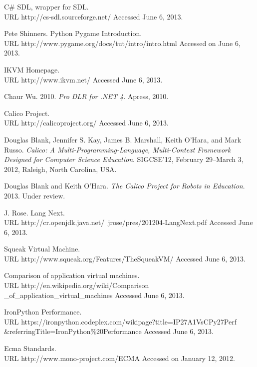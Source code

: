 \documentclass[preprint]{sigplanconf}
\begin{document}
\begin{thebibliography}{}
C\# SDL, wrapper for SDL.\\ URL http://cs-sdl.sourceforge.net/ Accessed June 6, 2013.

Pete Shinners. Python Pygame Introduction.\\ URL http://www.pygame.org/docs/tut/intro/intro.html Accessed on June 6, 2013.

IKVM Homepage.\\ URL http://www.ikvm.net/ Accessed June 6, 2013.

Chaur Wu. 2010. \textit{Pro DLR for .NET 4}. Apress, 2010.

Calico Project.\\ URL http://calicoproject.org/ Accessed June 6, 2013.

 Douglas Blank, Jennifer S. Kay, James
  B. Marshall, Keith O'Hara, and Mark Russo. \textit{Calico: A
    Multi-Programming-Language, Multi-Context Framework Designed for
    Computer Science Education}.  SIGCSE’12, February 29–March 3,
  2012, Raleigh, North Carolina, USA.

 Douglas Blank and Keith
  O'Hara. \textit{The Calico Project for Robots in
    Education}. 2013. Under review.

J. Rose. Lang Next.\\ URL
http://cr.openjdk.java.net/~jrose/pres/201204-LangNext.pdf Accessed
June 6, 2013.

Squeak Virtual Machine.\\ URL http://www.squeak.org/Features/TheSqueakVM/ Accessed June 6, 2013.

 Comparison of application virtual machines.\\ URL
  http://en.wikipedia.org/wiki/Comparison \_of\_application\_virtual\_machines
  Accessed June 6, 2013.

 IronPython Performance. \\ URL
  https://ironpython.codeplex.com/wikipage?title=IP27A1VsCPy27Perf
  \&referringTitle=IronPython\%20Performance Accessed June 6, 2013.

 Ecma Standards.\\
URL http://www.mono-project.com/ECMA Accessed on January 12, 2012.


\end{thebibliography}
\end{document}

